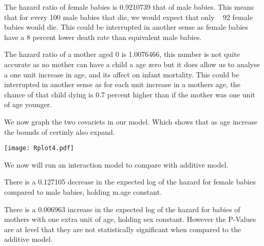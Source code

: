 \documentclass[12pt,letterpaper]{article}
\begin{document}
The hazard ratio of female babies is 0.9210739 that of male babies. This means that for every 100 male babies that die, we would expect that only ~ 92 female babies would die. This could be interrupted in another sense as female babies have a 8 percent lower death rate than equivalent male babies.


The hazard ratio of a mother aged 0 is 1.0076466, this number is not quite accurate as no mother can have a child a age zero but it does allow us to analyse a one unit increase in age, and its affect on infant mortality. This could be interrupted in another sense as for each unit increase in a mothers age, the chance of that child dying is 0.7 percent higher than if the mother was one unit of age younger. 



We now graph the two covariets in our model. Which shows that as age increase the bounds of certinly also expand.  

\texttt{[image: Rplot4.pdf]}

We now will run an interaction model to compare with additive model.


 
There is a 0.127105 decrease in the expected log of the hazard for female babies compared to male babies, holding m.age constant.

There is a 0.006963 increase in the expected log of the hazard for babies of mothers with one extra unit of age, holding sex constant. However the P-Values are at level that they are not statistically significant when compared to the additive model.
\end{document}
